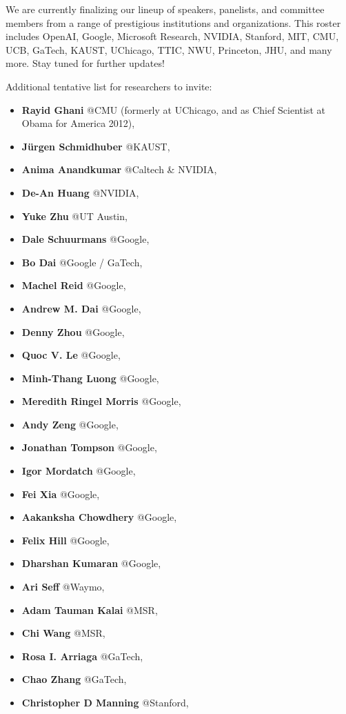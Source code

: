\documentclass[10pt]{article} %
\begin{document}
We are currently finalizing our lineup of speakers, panelists, and committee members from a range of prestigious institutions and organizations. This roster includes OpenAI, Google, Microsoft Research, NVIDIA, Stanford, MIT, CMU, UCB, GaTech, KAUST, UChicago, TTIC, NWU, Princeton, JHU, and many more. Stay tuned for further updates!


Additional tentative list for researchers to invite:
\begin{itemize}
\item \textbf{Rayid Ghani} @CMU (formerly at UChicago, and as Chief Scientist at Obama for America 2012),
\item \textbf{Jürgen Schmidhuber} @KAUST,
\item \textbf{Anima Anandkumar} @Caltech \& NVIDIA,
\item \textbf{De-An Huang} @NVIDIA,
\item \textbf{Yuke Zhu} @UT Austin,
\item \textbf{Dale Schuurmans} @Google,
\item \textbf{Bo Dai} @Google / GaTech,
\item \textbf{Machel Reid} @Google,
\item \textbf{Andrew M. Dai} @Google, 
\item \textbf{Denny Zhou} @Google, 
\item \textbf{Quoc V. Le} @Google,
\item \textbf{Minh-Thang Luong} @Google,
\item \textbf{Meredith Ringel Morris} @Google,
\item \textbf{Andy Zeng} @Google,
\item \textbf{Jonathan Tompson} @Google,
\item \textbf{Igor Mordatch} @Google,
\item \textbf{Fei Xia} @Google,
\item \textbf{Aakanksha Chowdhery} @Google,
\item \textbf{Felix Hill} @Google,
\item \textbf{Dharshan Kumaran} @Google,
\item \textbf{Ari Seff} @Waymo,
\item \textbf{Adam Tauman Kalai} @MSR,
\item \textbf{Chi Wang} @MSR,
\item \textbf{Rosa I. Arriaga} @GaTech,
\item \textbf{Chao Zhang} @GaTech,
\item \textbf{Christopher D Manning} @Stanford,

\end{itemize}
\end{document}
